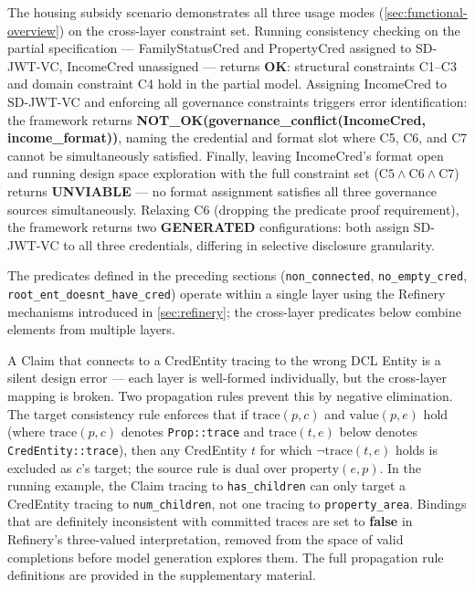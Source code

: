 The housing subsidy scenario demonstrates all three usage modes (\autoref{sec:functional-overview}) on the cross-layer constraint set. Running consistency checking on the partial specification --- FamilyStatusCred and PropertyCred assigned to SD-JWT-VC, IncomeCred unassigned --- returns \textbf{OK}: structural constraints C1--C3 and domain constraint C4 hold in the partial model. Assigning IncomeCred to SD-JWT-VC and enforcing all governance constraints triggers error identification: the framework returns \textbf{NOT\_OK(governance\_conflict(IncomeCred, income\_format))}, naming the credential and format slot where C5, C6, and C7 cannot be simultaneously satisfied. Finally, leaving IncomeCred's format open and running design space exploration with the full constraint set (\(\text{C5} \wedge \text{C6} \wedge \text{C7}\)) returns \textbf{UNVIABLE} --- no format assignment satisfies all three governance sources simultaneously. Relaxing C6 (dropping the predicate proof requirement), the framework returns two \textbf{GENERATED} configurations: both assign SD-JWT-VC to all three credentials, differing in selective disclosure granularity.

The predicates defined in the preceding sections (\texttt{non\_connected}, \texttt{no\_empty\_cred}, \texttt{root\_ent\_doesnt\_have\_cred}) operate within a single layer using the Refinery mechanisms introduced in \autoref{sec:refinery}; the cross-layer predicates below combine elements from multiple layers.

A Claim that connects to a CredEntity tracing to the wrong DCL Entity is a silent design error --- each layer is well-formed individually, but the cross-layer mapping is broken. Two propagation rules prevent this by negative elimination. The target consistency rule enforces that if \(\text{trace}(p, c)\) and \(\text{value}(p, e)\) hold (where \(\text{trace}(p, c)\) denotes \texttt{Prop::trace} and \(\text{trace}(t, e)\) below denotes \texttt{CredEntity::trace}), then any CredEntity \(t\) for which \(\neg\text{trace}(t, e)\) holds is excluded as \(c\)'s target; the source rule is dual over \(\text{property}(e, p)\). In the running example, the Claim tracing to \texttt{has\_children} can only target a CredEntity tracing to \texttt{num\_children}, not one tracing to \texttt{property\_area}. Bindings that are definitely inconsistent with committed traces are set to \textbf{false} in Refinery's three-valued interpretation, removed from the space of valid completions before model generation explores them. The full propagation rule definitions are provided in the supplementary material.

